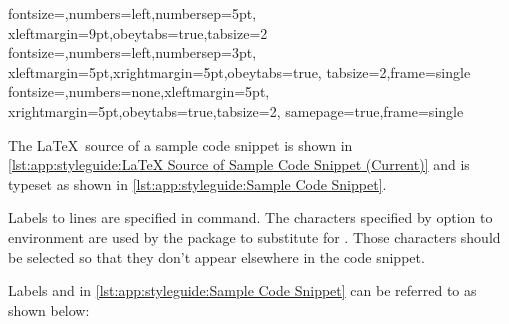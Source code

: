 \begin{VerbatimU}
%
  {fontsize=\scriptsize,numbers=left,numbersep=5pt,%
    xleftmargin=9pt,obeytabs=true,tabsize=2}
%
  {fontsize=\scriptsize,numbers=left,numbersep=3pt,%
    xleftmargin=5pt,xrightmargin=5pt,obeytabs=true,%
    tabsize=2,frame=single}
%
  {fontsize=\scriptsize,numbers=none,xleftmargin=5pt,%
    xrightmargin=5pt,obeytabs=true,tabsize=2,%
    samepage=true,frame=single}
\end{VerbatimU}


\begin{listing}[tb]
\begin{fcvlabel}
\end{fcvlabel}
\vspace*{-9pt}
\caption{\LaTeX\ Source of Sample Code Snippet (Current)}
\label{lst:app:styleguide:LaTeX Source of Sample Code Snippet (Current)}
\end{listing}



The \LaTeX\ source of a sample code snippet is shown in
\cref{lst:app:styleguide:LaTeX Source of Sample Code Snippet (Current)}
and is typeset as shown in
\cref{lst:app:styleguide:Sample Code Snippet}.

Labels to lines are specified in  command. The characters
specified by  option to  environment are
used by the  package to substitute \qco{\\lnlbl\{\}}
for . Those characters should be selected so that they
don't appear elsewhere in the code snippet.

Labels  and  in
\cref{lst:app:styleguide:Sample Code Snippet}
can be referred to as shown below:

